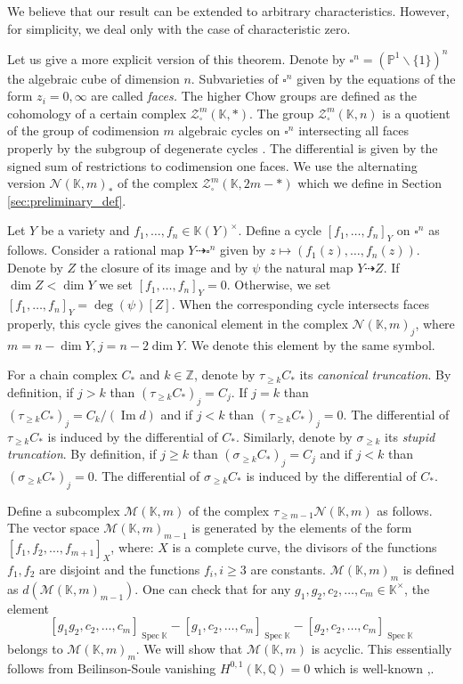 \documentclass[12pt]{extarticle}
\def\mb{\mathbb}
\def\mc{\mathcal}
\def\k{\mb K}
\def\Z{\mb Z}
\def\Q{\mb Q}
\def\N{\mc N}
\def\ard{\dashrightarrow}
\def\t{\times}
\renewcommand{\P}{{\mb P}}
\def\bs{\backslash}
\def \CH{\mc{N}}
\def \M{\mc M}
\DeclareMathOperator{\im}{Im}
\DeclareMathOperator{\spec}{Spec}
\begin{document}
  We believe that our result can be extended to arbitrary characteristics. However, for simplicity, we deal only with the case of characteristic zero.

  Let us give a more explicit version of this theorem. Denote by $\square^n=(\P^1\bs\{1\})^n$ the algebraic cube of dimension $n$. Subvarieties of $\square^n$ given by the equations of the form $z_i=0,\infty$ are called \emph{faces.} The higher Chow groups are defined as the cohomology of a certain complex $\mc Z_\square^m(\k,*)$. The group $\mc Z_\square^m(\k, n)$ is a quotient of the group of codimension $m$ algebraic cycles on $\square^{n}$ intersecting all faces properly by the subgroup of degenerate cycles \cite{bloch_rriz_1994_mixed}. The differential is given by the signed sum of restrictions to codimension one faces. We use the alternating version $\N(\k,m)_*$ of the complex $\mc Z_\square^m(\k,2m-*)$ which we define in Section \ref{sec:preliminary_def}. 
  
Let $Y$ be a variety and $f_1,\dots, f_n\in \k(Y)^\t$. Define a cycle $[f_1,\dots, f_n]_Y$ on $\square^n$ as follows. Consider a rational map $Y\ard \square^n$ given by $z\mapsto (f_1(z),\dots, f_n(z))$. Denote by $Z$ the closure of its image and by $\psi$ the natural map $Y\ard Z$. If $\dim Z< \dim Y$ we set $[f_1,\dots, f_n]_Y=0$. Otherwise, we set $[f_1,\dots, f_n]_Y=\deg(\psi)[Z]$. When the corresponding cycle intersects faces properly, this cycle gives the canonical element in the complex $\CH(\k,m)_j$, where $m=n-\dim Y, j=n-2\dim Y$. We denote this element by the same symbol.

For a chain complex $C_*$ and $k\in \Z$, denote by $\tau_{\geq k}C_*$ its \emph{canonical truncation}. By definition, if $j>k$ than $(\tau_{\geq k}C_*)_j=C_j$. If $j=k$ than $(\tau_{\geq k}C_*)_j=C_k/(\im d)$ and if $j<k$ than $(\tau_{\geq k}C_*)_j=0$. The differential of $\tau_{\geq k}C_*$ is induced by the differential of $C_*$. Similarly, denote by $\sigma_{\geq k}$ its \emph{stupid truncation}.  By definition, if $j\geq k$ than $(\sigma_{\geq k}C_*)_j=C_j$ and if $j<k$ than $(\sigma_{\geq k}C_*)_j=0$. The differential of $\sigma_{\geq k}C_*$ is induced by the differential of $C_*$.

Define a subcomplex $\M(\k,m)$ \cite{cubical1999herbert} of the complex $\tau_{\geq m-1}\CH(\k, m)$ as follows.  The vector space $\M(\k,m)_{m-1}$ is generated by the elements of the form $[f_1,f_2,\dots, f_{m+1}]_X$, where: $X$ is a complete curve, the divisors of the functions $f_1, f_2$ are disjoint and the functions $f_i,i\geq 3$ are constants. $\M(\k,m)_{m}$ is defined as $d(\M(\k,m)_{m-1})$. One can check that for any $g_1,g_2,c_2,\dots, c_{m}\in\k^\t$, the element
$$[g_1g_2,c_2,\dots, c_m]_{\spec \k}-[g_1,c_2,\dots, c_m]_{\spec \k}-[g_2,c_2,\dots, c_m]_{\spec \k}$$
belongs to $\M(\k,m)_m$.
We will show that $\M(\k,m)$ is acyclic. This essentially follows from Beilinson-Soule vanishing $H^{0,1}(\k,\Q)=0$ which is well-known \cite{bloch1986algebraic},\cite{voevodsky_six_lectures}.
\end{document}
